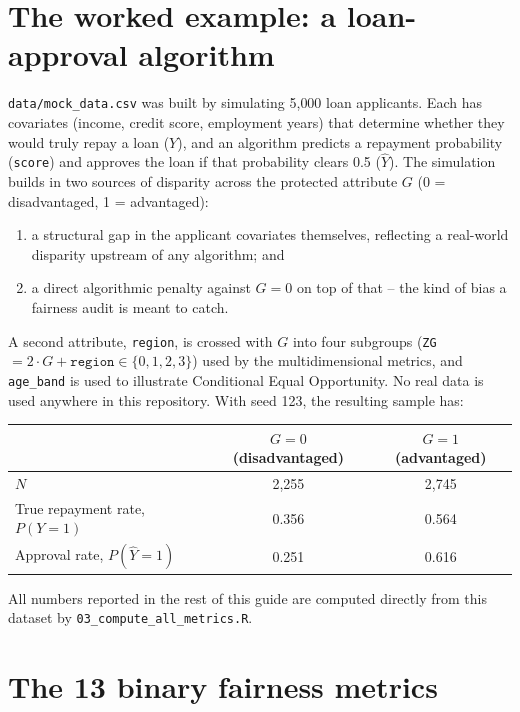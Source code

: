 \documentclass[11pt]{article}
\begin{document}
\section{The worked example: a loan-approval algorithm}

\texttt{data/mock\_data.csv} was built by simulating 5{,}000 loan applicants.
Each has covariates (income, credit score, employment years) that determine
whether they would truly repay a loan ($Y$), and an algorithm predicts a
repayment probability (\texttt{score}) and approves the loan if that
probability clears 0.5 ($\hat Y$). The simulation builds in two sources of
disparity across the protected attribute $G$ (0 = disadvantaged, 1 =
advantaged):

\begin{enumerate}
  \item a structural gap in the applicant covariates themselves, reflecting a
        real-world disparity upstream of any algorithm; and
  \item a direct algorithmic penalty against $G=0$ on top of that -- the kind
        of bias a fairness audit is meant to catch.
\end{enumerate}

A second attribute, \texttt{region}, is crossed with $G$ into four subgroups
(\texttt{ZG} $= 2\cdot G + \texttt{region} \in \{0,1,2,3\}$) used by the
multidimensional metrics, and \texttt{age\_band} is used to illustrate
Conditional Equal Opportunity. No real data is used anywhere in this
repository. With seed 123, the resulting sample has:

\begin{center}
\begin{tabular}{lcc}
\toprule
 & $G=0$ (disadvantaged) & $G=1$ (advantaged) \\
\midrule
$N$                    & 2{,}255 & 2{,}745 \\
True repayment rate, $P(Y=1)$   & 0.356 & 0.564 \\
Approval rate, $P(\hat Y=1)$    & 0.251 & 0.616 \\
\bottomrule
\end{tabular}
\end{center}

All numbers reported in the rest of this guide are computed directly from
this dataset by \texttt{03\_compute\_all\_metrics.R}.

\section{The 13 binary fairness metrics}
\end{document}
